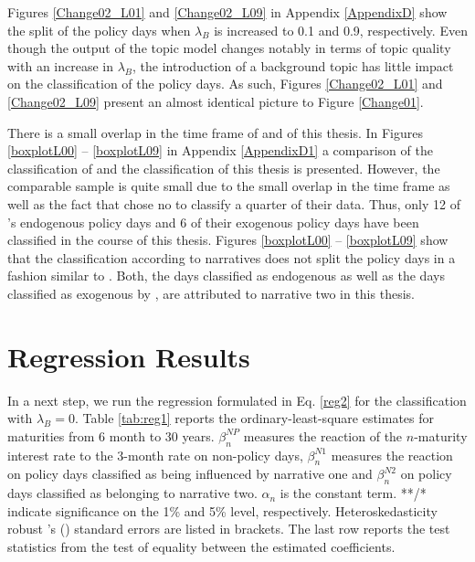 \documentclass[11pt,a4paper,english,oneside]{book}
\numberwithin{equation}{chapter}
\begin{document}
Figures \ref{Change02_L01} and \ref{Change02_L09} in Appendix \ref{AppendixD} show the split of the policy days when $\lambda_B$ is increased to 0.1 and 0.9, respectively. Even though the output of the topic model changes notably in terms of topic quality with an increase in $\lambda_B$, the introduction of a background topic has little impact on the classification of the policy days. As such, Figures \ref{Change02_L01} and \ref{Change02_L09} present an almost identical picture to Figure \ref{Change01}.

There is a small overlap in the time frame of \cite{Ellingsen.2003} and of this thesis. In Figures \ref{boxplotL00} -- \ref{boxplotL09} in Appendix \ref{AppendixD1} a comparison of the classification of \citeauthor{Ellingsen.2003} and the classification of this thesis is presented. However, the comparable sample is quite small due to the small overlap in the time frame as well as the fact that \citeauthor{Ellingsen.2003} chose no to classify a quarter of their data. Thus, only 12 of \citeauthor{Ellingsen.2003}'s endogenous policy days and 6 of their exogenous policy days have been classified in the course of this thesis. Figures \ref{boxplotL00} -- \ref{boxplotL09} show that the classification according to narratives does not split the policy days in a fashion similar to \citeauthor{Ellingsen.2003}. Both, the days classified as endogenous as well as the days classified as exogenous by \citeauthor{Ellingsen.2003}, are attributed to narrative two in this thesis.  
 
\section{Regression Results}\label{Ch:regressionresults}
In a next step, we run the regression formulated in Eq. \ref{reg2} for the  classification with $\lambda_B =0$. Table \ref{tab:reg1} reports the ordinary-least-square estimates for maturities from 6 month to 30 years. $\beta_n^{NP}$ measures the reaction of the $n$-maturity interest rate to the 3-month rate on non-policy days, $\beta_n^{N1}$ measures the reaction on policy days classified as being influenced by narrative one and $\beta_n^{N2}$ on policy days classified as belonging to narrative two. $\alpha_n$ is the constant term. **/* indicate significance on the 1\% and 5\% level, respectively. Heteroskedasticity robust \citeauthor{White.1980}'s (\citeyear{White.1980}) standard errors are listed in brackets. The last row reports the test statistics from the test of equality between the estimated coefficients.
\end{document}
